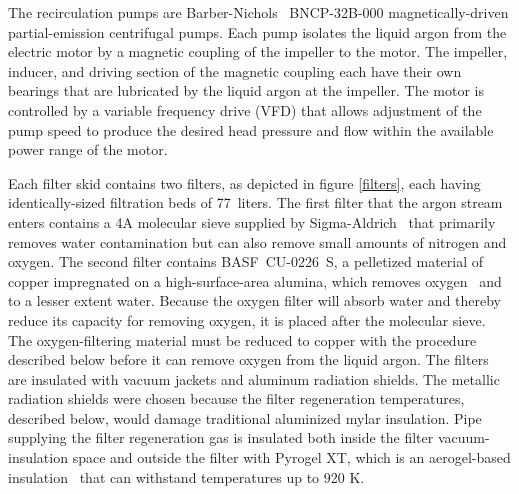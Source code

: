 
The recirculation pumps are Barber-Nichols~\cite{barber-nichols} BNCP-32B-000 magnetically-driven partial-emission centrifugal pumps.  Each pump isolates the liquid argon from the electric motor by a magnetic coupling of the impeller to the motor.  The impeller, inducer, and driving section of the magnetic coupling each have their own bearings that are lubricated by the liquid argon at the impeller.  The motor is controlled by a variable frequency drive (VFD) that allows adjustment of the pump speed to produce the desired head pressure and flow within the available power range of the motor.    


Each filter skid contains two filters, as depicted in figure \ref{filters}, each having identically-sized filtration beds of 77~liters.  The first filter that the argon stream enters contains a 4A molecular sieve supplied by Sigma-Aldrich~\cite{sigma-aldrich} that primarily removes water contamination but can also remove small amounts of nitrogen and oxygen.  The second filter contains BASF~CU-0226~S, a pelletized material of copper impregnated on a high-surface-area alumina, which removes oxygen~\cite{basf} and to a lesser extent water.  Because the oxygen filter will absorb water and thereby reduce its capacity for removing oxygen, it is placed after the molecular sieve.  The oxygen-filtering material must be reduced to copper with the procedure described below before it can remove oxygen from the liquid argon.  The filters are insulated with vacuum jackets and aluminum radiation shields.  The metallic radiation shields were chosen because the filter regeneration temperatures, described below, would damage traditional aluminized mylar insulation.  Pipe supplying the filter regeneration gas is insulated both inside the filter vacuum-insulation space and outside the filter with Pyrogel XT, which is an aerogel-based insulation~\cite{aspen-aerogels} that can withstand temperatures up to 920 K. 

